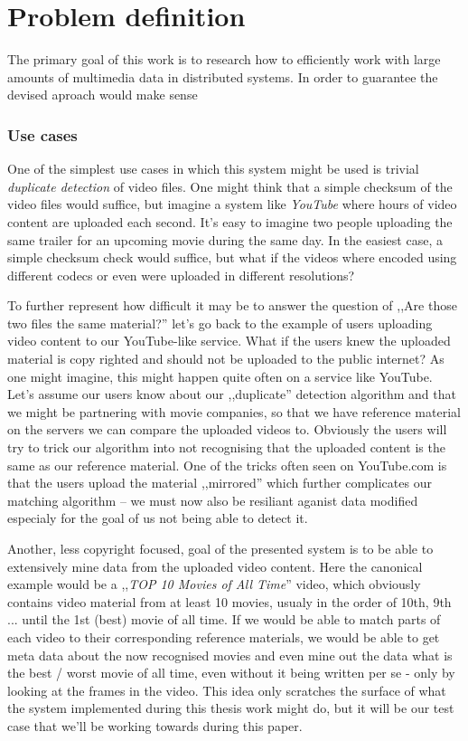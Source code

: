 \chapter{Problem definition}
The primary goal of this work is to research how to efficiently work with large amounts of multimedia data in distributed systems. 
In order to guarantee the devised aproach would make sense

\subsection{Use cases}

One of the simplest use cases in which this system might be used is trivial \textit{duplicate detection} of video files.
One might think that a simple checksum of the video files would suffice, but imagine a system like \textit{YouTube} where hours of video content are uploaded 
each second. It's easy to imagine two people uploading the same trailer for an upcoming movie during the same day. In the easiest case, a simple checksum
check would suffice, but what if the videos where encoded using different codecs or even were uploaded in different resolutions?

To further represent how difficult it may be to answer the question of ,,Are those two files the same material?'' let's go back to the example of users
uploading video content to our YouTube-like service. What if the users knew the uploaded material is copy righted and should not be uploaded to the public
internet? As one might imagine, this might happen quite often on a service like YouTube. Let's assume our users know about our ,,duplicate'' detection
algorithm and that we might be partnering with movie companies, so that we have reference material on the servers we can compare the uploaded videos to.
Obviously the users will try to trick our algorithm into not recognising that the uploaded content is the same as our reference material. One of the tricks
often seen on YouTube.com is that the users upload the material ,,mirrored'' which further complicates our matching algorithm -- we must now also be 
resiliant aganist data modified especialy for the goal of us not being able to detect it.

Another, less copyright focused, goal of the presented system is to be able to extensively mine data from the uploaded video content.
Here the canonical example would be a ,,\textit{TOP 10 Movies of All Time}'' video, which obviously contains video material from at least 10 movies,
usualy in the order of 10th, 9th ... until the 1st (best) movie of all time. If we would be able to match parts of each video to their corresponding 
reference materials, we would be able to get meta data about the now recognised movies and even mine out the data what is the best / worst movie of all time,
even without it being written per se - only by looking at the frames in the video. This idea only scratches the surface of what the system implemented during
this thesis work might do, but it will be our test case that we'll be working towards during this paper.

